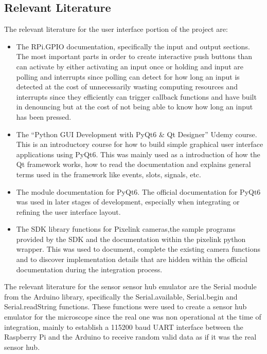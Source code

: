 \subsection{Relevant Literature}
The relevant literature for the user interface portion of the project are:
\begin{itemize}
	\item The RPi.GPIO documentation, specifically the input and output sections.\cite{RaspberrygpiopythonWikiExamples} The most important parts in order to create interactive push buttons than can activate by either activating an input once or holding and input are polling and interrupts since polling can detect for how long an input is detected at the cost of unnecessarily wasting computing resources and interrupts since they efficiently can trigger callback functions and have built in denouncing but at the cost of not being able to know how long an input has been pressed.
	\item The ``Python GUI Development with PyQt6 \& Qt Designer'' Udemy course.\cite{PythonGUIDevelopmenta} This is an introductory course for how to build simple graphical user interface applications using PyQt6. This was mainly used as a introduction of how the Qt framework works, how to read the documentation and explains general terms used in the framework like events, slots, signals, etc.
	\item The module documentation for PyQt6.\cite{ModulesPyQtDocumentation} The official documentation for PyQt6 was used in later stages of development, especially when integrating or refining the user interface layout.
	\item The SDK library functions for Pixelink cameras,the sample programs provided by the SDK and the documentation within the pixelink python wrapper.\cite{WhatFunctionsFeatures} This was used to document, complete the existing camera functions and to discover implementation details that are hidden within the official documentation during the integration process.
\end{itemize}
The relevant literature for the sensor sensor hub emulator are the Serial module from the Arduino library, specifically the Serial.available, Serial.begin and Serial.readString functions.\cite{SerialAvailableArduino, SerialBeginArduino, SerialReadStringArduino} These functions were used to create a sensor hub emulator for the microscope since the real one was non operational at the time of integration, mainly to establish a 115200 baud UART interface between the Raspberry Pi and the Arduino to receive random valid data as if it was the real sensor hub.

